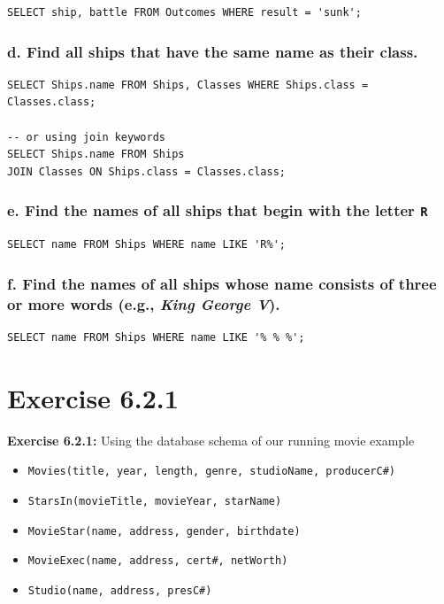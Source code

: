 \documentclass{cshwk}
\begin{document}
\begin{lstlisting}
SELECT ship, battle FROM Outcomes WHERE result = 'sunk';
\end{lstlisting}

\subsubsection*{d. Find all ships that have the same name as their class.}

\begin{lstlisting}
SELECT Ships.name FROM Ships, Classes WHERE Ships.class = Classes.class;

-- or using join keywords
SELECT Ships.name FROM Ships
JOIN Classes ON Ships.class = Classes.class;
\end{lstlisting}

\subsubsection*{e. Find the names of all ships that begin with the letter \texttt{R}}

\begin{lstlisting}
SELECT name FROM Ships WHERE name LIKE 'R%';
\end{lstlisting}

\subsubsection*{f. Find the names of all ships whose name consists of three or more words (e.g., \textit{King George V}).}

\begin{lstlisting}
SELECT name FROM Ships WHERE name LIKE '% % %';
\end{lstlisting}

\section{Exercise 6.2.1}
\textbf{Exercise 6.2.1:} Using the database schema of our running movie example

\begin{itemize}
    \item \texttt{Movies(title, year, length, genre, studioName, producerC\#)}
    \item \texttt{StarsIn(movieTitle, movieYear, starName)}
    \item \texttt{MovieStar(name, address, gender, birthdate)}
    \item \texttt{MovieExec(name, address, cert\#, netWorth)}
    \item \texttt{Studio(name, address, presC\#)}
\end{itemize}
\end{document}
